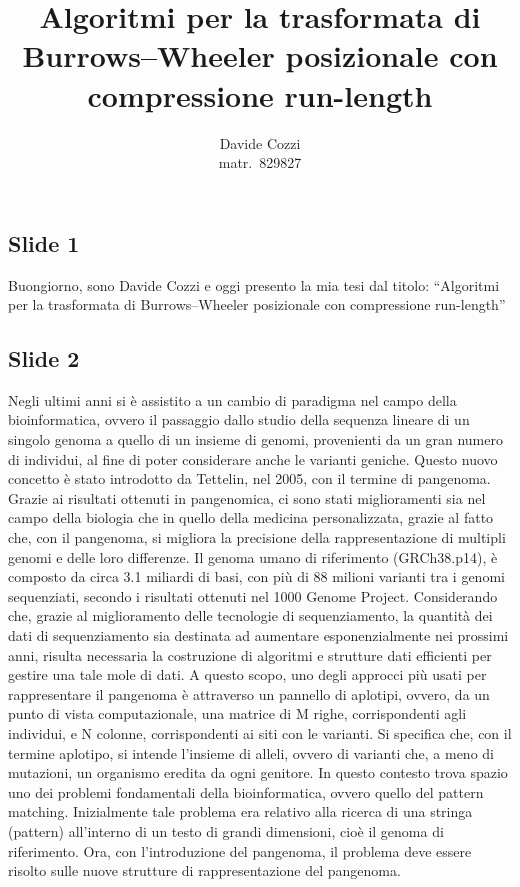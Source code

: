 \documentclass[a4paper,11pt, oneside,italian]{article}
\title{Algoritmi per la trasformata di Burrows--Wheeler
  posizionale con compressione run-length}
\author{Davide Cozzi\\\smaller matr.~829827}
\date{}
\begin{document}
\maketitle
{}
\noindent
\subsection*{Slide 1}
Buongiorno, sono Davide Cozzi e oggi presento la mia tesi dal titolo:
``Algoritmi per la trasformata di Burrows--Wheeler posizionale con
compressione run-length''
\subsection*{Slide 2}
Negli ultimi anni si è assistito a un cambio di paradigma nel campo della
bioinformatica, ovvero il passaggio dallo studio della sequenza lineare di un
singolo genoma a quello di un insieme di genomi, provenienti da un gran numero
di individui, al fine di poter considerare anche le varianti geniche. Questo
nuovo concetto è stato introdotto da Tettelin, nel 2005, con il termine di
pangenoma. Grazie ai risultati ottenuti in pangenomica, ci sono stati
miglioramenti sia nel campo della biologia che in quello della medicina
personalizzata, grazie al fatto che, con il pangenoma, si migliora la precisione
della rappresentazione di multipli genomi e delle loro differenze. Il genoma
umano di riferimento (GRCh38.p14), è composto da circa 3.1 miliardi di basi, con
più di 88 milioni varianti tra i genomi sequenziati, secondo i risultati
ottenuti nel 1000 Genome Project. Considerando che, grazie al miglioramento
delle tecnologie di sequenziamento, la quantità dei dati di sequenziamento sia
destinata ad aumentare esponenzialmente nei prossimi anni, risulta necessaria la
costruzione di algoritmi e strutture dati eﬀicienti per gestire una tale mole di
dati. A questo scopo, uno degli approcci più usati per rappresentare il
pangenoma è attraverso un pannello di aplotipi, ovvero, da un punto di vista
computazionale, una matrice di M righe, corrispondenti agli individui, e N
colonne, corrispondenti ai siti con le varianti. Si specifica che, con il
termine aplotipo, si intende l'insieme di alleli, ovvero di varianti che, a meno
di mutazioni, un organismo eredita da ogni genitore.
In questo contesto trova spazio uno dei problemi fondamentali della
bioinformatica, ovvero quello del pattern matching. Inizialmente tale problema
era relativo alla ricerca di una stringa (pattern) all'interno di un testo di
grandi dimensioni, cioè il genoma di riferimento. Ora, con l'introduzione del
pangenoma, il problema deve essere risolto sulle nuove strutture di
rappresentazione del pangenoma.
\end{document}
